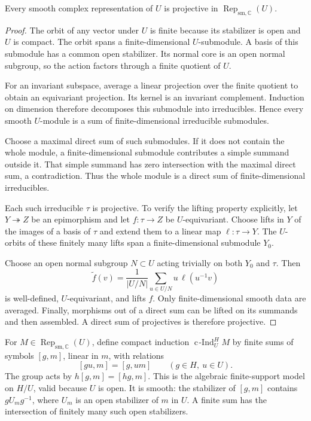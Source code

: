 \begin{lemma}\label{v4-arith:ic:w10-d:fixed-center:lem:compact}
Every smooth complex representation of $U$ is projective in
$\operatorname{Rep}_{\mathrm{sm},\mathbb C}(U)$.
\end{lemma}
\begin{proof}
The orbit of any vector under $U$ is finite because its stabilizer is open and $U$ is compact.
The orbit spans a finite-dimensional $U$-submodule.
A basis of this submodule has a common open stabilizer.
Its normal core is an open normal subgroup, so the action factors through a finite quotient of $U$.

For an invariant subspace, average a linear projection over the finite quotient to obtain an equivariant projection.
Its kernel is an invariant complement.
Induction on dimension therefore decomposes this submodule into irreducibles.
Hence every smooth $U$-module is a sum of finite-dimensional irreducible submodules.

Choose a maximal direct sum of such submodules.
If it does not contain the whole module, a finite-dimensional submodule contributes a simple summand outside it.
That simple summand has zero intersection with the maximal direct sum, a contradiction.
Thus the whole module is a direct sum of finite-dimensional irreducibles.

Each such irreducible $\tau$ is projective.
To verify the lifting property explicitly, let $Y\twoheadrightarrow Z$ be an epimorphism and let $f:\tau\to Z$ be $U$-equivariant.
Choose lifts in $Y$ of the images of a basis of $\tau$ and extend them to a linear map $\ell:\tau\to Y$.
The $U$-orbits of these finitely many lifts span a finite-dimensional submodule $Y_0$.

Choose an open normal subgroup $N\subset U$ acting trivially on both $Y_0$ and $\tau$.
Then
\[
 \widetilde f(v)=\frac1{|U/N|}\sum_{u\in U/N}u\,\ell(u^{-1}v)
\]
is well-defined, $U$-equivariant, and lifts $f$.
Only finite-dimensional smooth data are averaged.
Finally, morphisms out of a direct sum can be lifted on its summands and then assembled.
A direct sum of projectives is therefore projective.
\end{proof}

For $M\in\operatorname{Rep}_{\mathrm{sm},\mathbb C}(U)$, define compact induction
$\operatorname{c\!\operatorname{-}Ind}_U^H M$ by finite sums of symbols $[g,m]$, linear in $m$, with relations
\[
 [gu,m]=[g,um]\qquad(g\in H,\ u\in U).
\]
The group acts by $h[g,m]=[hg,m]$.
This is the algebraic finite-support model on $H/U$, valid because $U$ is open.
It is smooth: the stabilizer of $[g,m]$ contains $gU_mg^{-1}$, where $U_m$ is an open stabilizer of $m$ in $U$.
A finite sum has the intersection of finitely many such open stabilizers.

